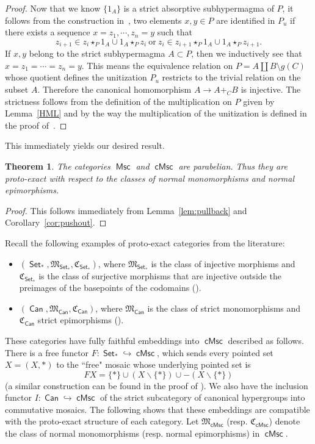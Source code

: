 \documentclass[reqno]{amsart}
\newcommand{\cat}[1]{\ensuremath{\mathsf{#1}}}
\DeclareMathOperator{\Set}{\cat{Set}}
\DeclareMathOperator{\Msc}{\cat{Msc}}
\DeclareMathOperator{\cMsc}{\cat{cMsc}}
\DeclareMathOperator{\Can}{\cat{Can}}
\numberwithin{equation}{section}
\theoremstyle{plain}
\newtheorem{theorem}[equation]{Theorem}
\theoremstyle{definition}
\begin{document}
\begin{proof}
Now that we know $\{1_A\}$ is a strict absorptive subhypermagma of $P$, it follows from
the construction in~\cite[Lemma 3.10]{NakamuraReyes}, two elements $x, y\in P$ are identified in $P_u$ if there exists a sequence $x=z_1, \cdots, z_n=y$ such that 
$$z_{i+1}\in z_i\star_P 1_A\cup 1_A\star_P z_i\ \text{or}\ z_{i}\in z_{i+1}\star_P 1_A\cup 1_A\star_P z_{i+1}.$$
If $x, y$ belong to the strict subhypermagma $A\subset P$, then we inductively see that 
$x=z_1=\cdots=z_n=y$. This means 
the equivalence relation on $P=A\coprod B\setminus g(C)$ whose quotient defines the unitization $P_u$ restricts to the trivial relation on the subset $A$. Therefore the canonical homomorphism $A\rightarrow A+_CB$ is injective. The strictness follows from the definition of the multiplication on $P$ given by Lemma~\ref{HML} and by the way the multiplication of the unitization is defined in the proof of~\cite[Lemma~3.10]{NakamuraReyes}.
\end{proof}

This immediately yields our desired result.

\begin{theorem}\label{thm:parabelian}
The categories $\Msc$ and $\cMsc$ are parabelian. Thus they are proto-exact with respect to the classes of normal monomorphisms and normal epimorphisms.
\end{theorem}

\begin{proof}
    This follows immediately from Lemma~\ref{lem:pullback} and Corollary~\ref{cor:pushout}.
\end{proof}

Recall the following examples of proto-exact categories from the literature:
\begin{itemize}
\item   $(\Set_*, \mathfrak{M}_{\Set_*}, \mathfrak{C}_{\Set_*})$, where $\mathfrak{M}_{\Set_*}$ is the class of injective morphisms and $\mathfrak{C}_{\Set_*}$ is the class of surjective morphisms that are injective outside the preimages of the basepoints of the codomains (\cite[Example 2.4]{JST}).
\item $(\Can, \mathfrak{M}_{\Can}, \mathfrak{C}_{\Can})$, where $\mathfrak{M}_{\Can}$ is the class of strict monomorphisms and $\mathfrak{C}_{\Can}$ strict epimorphisms (\cite[Theorem 5.11]{JST}).
\end{itemize}  
These categories have fully faithful embeddings into $\cMsc$ described as follows. There is a free functor $F \colon \Set_*\hookrightarrow \cMsc$, which sends every pointed set $X=(X, *)$ to the “free" mosaic whose underlying pointed set is 
$$FX=\{*\}\cup (X\backslash \{*\})\cup -(X\backslash \{*\})$$ 
(a similar construction can be found in the proof of \cite[Theorem 4.3]{NakamuraReyes}).
We also have the inclusion functor $I \colon \Can \hookrightarrow \cMsc$ of the strict subcategory of canonical hypergroups into commutative mosaics. 
The following shows that these embeddings are compatible with the proto-exact structure of each category. Let $\mathfrak{M}_{\cMsc}$ (resp. $\mathfrak{C}_{\cMsc}$) denote the class of normal monomorphisms (resp. normal epimorphisms) in $\cMsc$.
\end{document}
